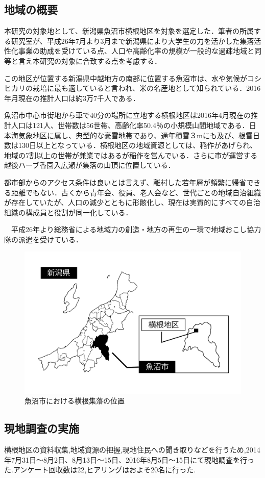 \documentclass[a4paper]{jsarticle}
\begin{document}
\subsection{地域の概要}
本研究の対象地として、新潟県魚沼市横根地区を対象を選定した．筆者の所属する研究室が、平成26年7月より3月まで新潟県により大学生の力を活かした集落活性化事業の助成を受けている点、人口や高齢化率の規模が一般的な過疎地域と同等と言え本研究の対象に合致する点を考慮する．\par
この地区が位置する新潟県中越地方の南部に位置する魚沼市は、水や気候がコシヒカリの栽培に最も適していると言われ、米の名産地として知られている．2016年月現在の推計人口は約3万7千人である．\par
魚沼市中心市街地から車で40分の場所に立地する横根地区は2016年4月現在の推計人口は121人、世帯数は56世帯、高齢化率50.4％の小規模山間地域である．日本海気象地区に属し、典型的な豪雪地帯であり、通年積雪３mにも及び、根雪日数は130日以上となっている．横根地区の地域資源としては、稲作があげられ、地域の7割以上の世帯が兼業ではあるが稲作を営んでいる．さらに市が運営する越後ハーブ香園入広瀬が集落の山頂に位置している．\par
都市部からのアクセス条件は良いとは言えず、離村した若年層が頻繁に帰省できる距離でもない．古くから青年会、役員、老人会など、世代ごとの地域自治組織が存在していたが、人口の減少とともに形骸化し、現在は実質的にすべての自治組織の構成員と役割が同一化している．\par
　平成26年より総務省による地域力の創造・地方の再生の一環で地域おこし協力隊の派遣を受けている．

\begin{figure}[H]
  \begin{center}
    \includegraphics[width=0.7\hsize]{./images/yokone_place.pdf}
    \caption{魚沼市における横根集落の位置}
    \label{fig:tmu_hino}
  \end{center}
\end{figure}

\subsection{現地調査の実施}
横根地区の資料収集,地域資源の把握,現地住民への聞き取りなどを行うため,2014年7月31日〜8月2日、8月13日〜15日、2016年8月5日〜15日にて現地調査を行った.アンケート回収数は22,ヒアリングはおよそ20名に行った.\par
\end{document}
